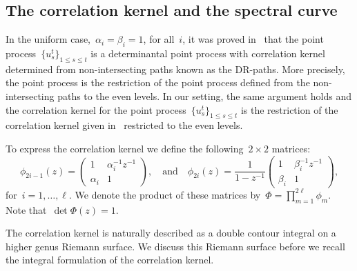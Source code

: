 \documentclass[11pt]{article}
\theoremstyle{plain}
\theoremstyle{definition}
\numberwithin{equation}{section}
\begin{document}
\subsection{The correlation kernel and the spectral curve}\label{sec:kernel}

In the uniform case,~$\alpha_i=\beta_i=1$, for all~$i$, it was proved in~\cite{Joh05a} that the point process~$\{u_s^t\}_{1\leq s\leq t}$ is a determinantal point process with correlation kernel determined from non-intersecting paths known as the DR-paths. More precisely, the point process is the restriction of the point process defined from the non-intersecting paths to the even levels. In our setting, the same argument holds and the correlation kernel for the point process~$\{u_s^t\}_{1\leq s\leq t}$ is the restriction of the correlation kernel given in~\cite{Ber21} restricted to the even levels. 

To express the correlation kernel we define the following~$2\times 2$ matrices:
\begin{equation}\label{eq:transition_matrices}
\phi_{2i-1}(z)=
\begin{pmatrix}
1 & \alpha_i^{-1} z^{-1} \\
\alpha_i & 1
\end{pmatrix},
\quad \text{and} \quad
\phi_{2i}(z)=\frac{1}{1-z^{-1}}
\begin{pmatrix}
1 & \beta_i^{-1} z^{-1} \\
\beta_i & 1
\end{pmatrix}, 
\end{equation}
for~$i=1,\dots,\ell$. We denote the product of these matrices by~$\Phi=\prod_{m=1}^{2\ell}\phi_m$. Note that~$\det \Phi(z)=1$. 

The correlation kernel is naturally described as a double contour integral on a higher genus Riemann surface. We discuss this Riemann surface before we recall the integral formulation of the correlation kernel. 
\end{document}
